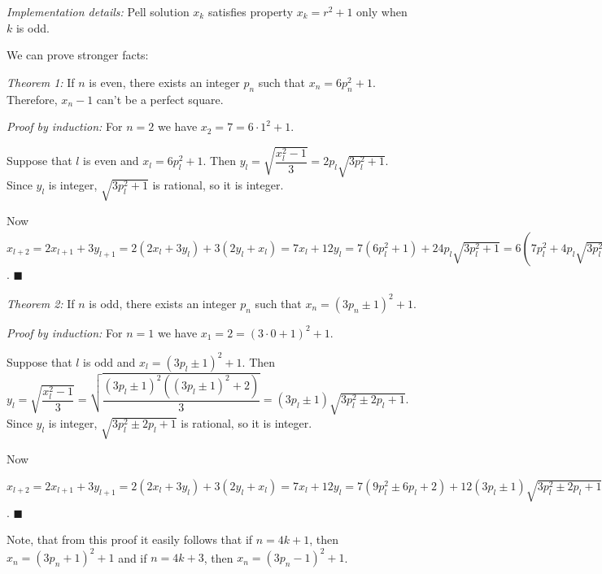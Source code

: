 \documentclass[a4paper,12pt]{article}
\newcommand*{\QED}{\hfill\ensuremath{\blacksquare}}
\begin{document}
\begin{itemize}
\textit{Implementation details:} Pell solution \(x_k\)
satisfies property \(x_k = r^2 + 1\) only when \(k\) is odd.

We can prove stronger facts:

\textit{Theorem 1:} If \(n\) is even, there exists an integer \(p_n\) such that
\(x_n = 6p_n^2 + 1\). Therefore, \(x_n - 1\) can't be a perfect square.

\textit{Proof by induction:} For \(n = 2\) we have \(x_2 = 7 = 6 \cdot 1^2 + 1\).

Suppose that \(l\) is even and \(x_l = 6p_l^2 + 1\). Then
\(y_l = \sqrt{\dfrac{x_l^2 - 1}{3}} = 2p_l\sqrt{3p_l^2 + 1}\).
Since \(y_l\) is integer, \(\sqrt{3p_l^2 + 1}\) is rational, so it is integer.

Now \(x_{l + 2} = 2x_{l + 1} + 3y_{l + 1} = 2(2x_l + 3y_l) + 3(2y_l + x_l) =
7x_l + 12y_l = 7(6p_l^2 + 1) + 24p_l\sqrt{3p_l^2 + 1} =
6(7p_l^2 + 4p_l\sqrt{3p_l^2 + 1} + 1) + 1 =
6(2p_l + \sqrt{3p_l^2 + 1})^2 + 1\). \QED

\textit{Theorem 2:} If \(n\) is odd, there exists an integer \(p_n\) such that
\(x_n = (3p_n \pm 1)^2 + 1\).

\textit{Proof by induction:} For \(n = 1\) we have
\(x_1 = 2 = (3 \cdot 0 + 1)^2 + 1\).

Suppose that \(l\) is odd and \(x_l = (3p_l \pm 1)^2 + 1\). Then
\(y_l = \sqrt{\dfrac{x_l^2 - 1}{3}} =
\sqrt{\dfrac{(3p_l \pm 1)^2((3p_l \pm 1)^2 + 2)}{3}} =
(3p_l \pm 1) \sqrt{3p_l^2 \pm 2p_l + 1}\). Since \(y_l\) is integer,
\(\sqrt{3p_l^2 \pm 2p_l + 1}\) is rational, so it is integer.

Now \(x_{l + 2} = 2x_{l + 1} + 3y_{l + 1} = 2(2x_l + 3y_l) + 3(2y_l + x_l) =
7x_l + 12y_l = 7(9p_l^2 \pm 6p_l + 2) + 12(3p_l \pm 1)\sqrt{3p_l^2 \pm 2p_l + 1} =
(3\sqrt{3p_l^2 \pm 2p_l + 1} + 2(3p_l \pm 1))^2 =
(3(\sqrt{3p_l^2 \pm 2p_l + 1} + 2p_l) \pm 2)^2\). \QED

Note, that from this proof it easily follows that if \(n = 4k + 1\), then
\(x_n = (3p_n + 1)^2 + 1\) and if \(n = 4k + 3\), then
\(x_n = (3p_n - 1)^2 + 1\).

\end{itemize}
\end{document}
